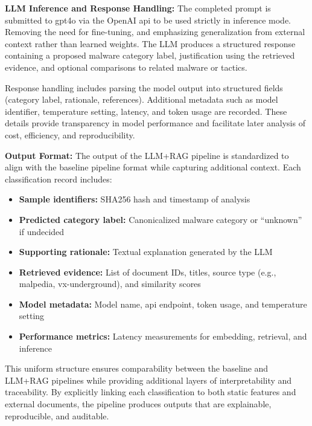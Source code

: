 \vspace{0.5em}
\noindent\textbf{LLM Inference and Response Handling:}
The completed prompt is submitted to \gls{gpt4o} via the OpenAI \gls{api} to be used
strictly in inference mode. Removing the need for fine-tuning, and emphasizing
generalization from external context rather than learned weights. The LLM
produces a structured response containing a proposed malware category label,
justification using the retrieved evidence, and optional comparisons to related malware or tactics.

Response handling includes parsing the model output into structured fields (category label,
rationale, references). Additional metadata such as model identifier, temperature setting, latency,
and token usage are recorded. These details provide transparency in model performance and
facilitate later analysis of cost, efficiency, and reproducibility.

\vspace{0.5em}
\noindent\textbf{Output Format:}
The output of the LLM+RAG pipeline is standardized to align with the baseline pipeline format while
capturing additional context. Each classification record includes:
\begin{itemize}
      \item \textbf{Sample identifiers:} SHA256 hash and timestamp of analysis
      \item \textbf{Predicted category label:} Canonicalized malware category or “unknown” if undecided
      \item \textbf{Supporting rationale:} Textual explanation generated by the LLM
      \item \textbf{Retrieved evidence:} List of document IDs, titles, source type (e.g., \gls{malpedia}, \gls{vx-underground}),
            and similarity scores
      \item \textbf{Model metadata:} Model name, \gls{api} endpoint, token usage, and temperature setting
      \item \textbf{Performance metrics:} Latency measurements for embedding, retrieval, and inference
\end{itemize}

This uniform structure ensures comparability between the baseline and LLM+RAG pipelines while
providing additional layers of interpretability and traceability. By explicitly linking each
classification to both static features and external documents, the pipeline produces outputs that
are explainable, reproducible, and auditable.

